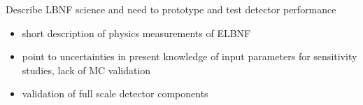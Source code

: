 Describe LBNF science and need to prototype and test detector performance


\begin{itemize}
\item short description of physics measurements of ELBNF
\item point to uncertainties in present knowledge of input parameters for sensitivity studies, lack of MC validation
\item validation of full scale detector components


\end{itemize}

